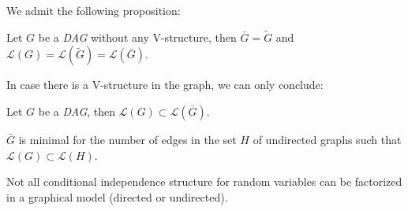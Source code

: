 \documentclass[12pt]{report}
\begin{document}
We admit the following proposition:
\begin{proposition}
	Let $G$ be a \emph{DAG} without any V-structure, then $\bar{G} = \tilde{G}$ and $\mathcal{L}(G)=\mathcal{L}(\tilde{G})=\mathcal{L}(\bar{G}).$
\end{proposition}
In case there is a V-structure in the graph, we can only conclude:
\begin{proposition}
	Let $G$ be a \emph{DAG}, then $\mathcal{L}(G) \subset \mathcal{L}(\bar{G})$.
\end{proposition}
$\bar{G}$ is minimal for the number of edges in the set $H$ of undirected graphs such that $\mathcal{L}(G)\subset\mathcal{L}(H)$.
\begin{danger} Not all conditional independence structure for random variables can be factorized in a graphical model (directed or undirected).
\end{danger}
\end{document}
